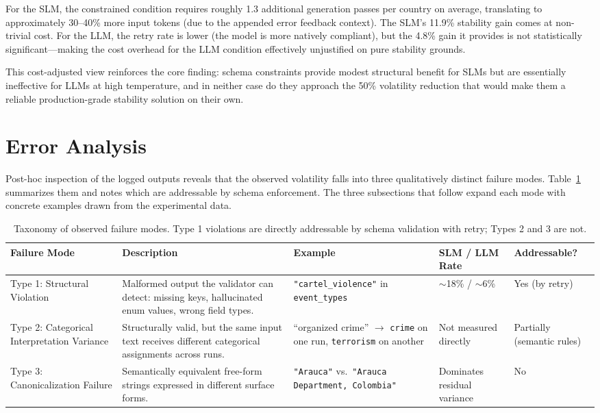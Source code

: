 \documentclass[sigconf]{acmart}
\begin{document}
For the SLM, the constrained condition requires roughly 1.3 additional generation passes per country on average, translating to approximately 30--40\% more input tokens (due to the appended error feedback context). The SLM's 11.9\% stability gain comes at non-trivial cost. For the LLM, the retry rate is lower (the model is more natively compliant), but the 4.8\% gain it provides is not statistically significant---making the cost overhead for the LLM condition effectively unjustified on pure stability grounds.

This cost-adjusted view reinforces the core finding: schema constraints provide modest structural benefit for SLMs but are essentially ineffective for LLMs at high temperature, and in neither case do they approach the 50\% volatility reduction that would make them a reliable production-grade stability solution on their own.

\section{Error Analysis}
\label{sec:error}

Post-hoc inspection of the logged outputs reveals that the observed volatility falls into three qualitatively distinct failure modes. Table~\ref{tab:errortaxonomy} summarizes them and notes which are addressable by schema enforcement. The three subsections that follow expand each mode with concrete examples drawn from the experimental data.

\begin{table}[t]
\caption{Taxonomy of observed failure modes. Type 1 violations are directly addressable by schema validation with retry; Types 2 and 3 are not.}
\label{tab:errortaxonomy}
\small
\begin{tabular}{p{2.2cm}p{4.5cm}p{2.5cm}p{2.5cm}p{2cm}}
\toprule
\textbf{Failure Mode} & \textbf{Description} & \textbf{Example} & \textbf{SLM / LLM Rate} & \textbf{Addressable?} \\
\midrule
Type 1: Structural Violation &
Malformed output the validator can detect: missing keys, hallucinated enum values, wrong field types. &
\texttt{"cartel\_violence"} in \texttt{event\_types} &
$\sim$18\% / $\sim$6\% &
Yes (by retry) \\
\addlinespace
Type 2: Categorical Interpretation Variance &
Structurally valid, but the same input text receives different categorical assignments across runs. &
``organized crime'' $\to$ \texttt{crime} on one run, \texttt{terrorism} on another &
Not measured directly &
Partially (semantic rules) \\
\addlinespace
Type 3: Canonicalization Failure &
Semantically equivalent free-form strings expressed in different surface forms. &
\texttt{"Arauca"} vs.\ \texttt{"Arauca Department, Colombia"} &
Dominates residual variance &
No \\
\bottomrule
\end{tabular}
\end{table}
\end{document}
